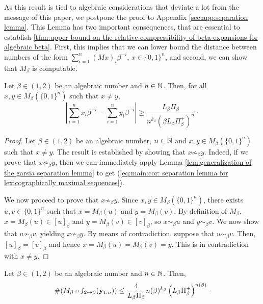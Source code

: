 As this result is tied to algebraic considerations that deviate a lot from the message of this paper, we postpone the proof to Appendix \ref{sec:app:separation lemma}. This Lemma has two important consequences, that are essential to establish \ref{thm:upper bound on the relative compressibility of beta expansions for algebraic beta}. First, this implies that we can lower bound the distance between numbers of the form $\sum_{i=1}^n (Mx)_i \beta^{-i}$, $x \in \{0,1\}^n$, and second, we can show that $M_\beta$ is computable.
\begin{corollary}\label{cor: separation lemma for lexicographically maximal sequences}
    Let $\beta \in (1,2)$ be an algebraic number and $n \in \mathbb{N}$. Then, for all $x,y \in M_\beta\left(\{0,1\}^n\right)$ such that $x \neq y$,
    \begin{equation}\label{eq:main:cor: separation lemma for lexicographically maximal sequences}
        \left|\sum_{i=1}^n x_i \beta^{-i} - \sum_{i=1}^n y_i \beta^{-i}\right| \geq \frac{L_\beta\Pi_\beta}{\displaystyle  n^{k_\beta}\left(\beta L_\beta \Pi_\beta^+ \right)^n}\cdot
    \end{equation}
\end{corollary}
\begin{proof}
    Let $\beta \in (1,2)$ be an algebraic number, $n \in \mathbb{N}$ and $x,y \in M_\beta\left(\{0,1\}^n\right)$ such that $x \neq y$. The result is established by showing that $x \not\sim_\beta y$. Indeed, if we prove that $x \not\sim_\beta y$, then we can immediately apply Lemma \ref{lem:generalization of the garsia separation lemma} to get (\ref{eq:main:cor: separation lemma for lexicographically maximal sequences}).
    
    We now proceed to prove that $x \not\sim_\beta y$. Since $x,y \in M_\beta(\{0,1\}^n)$, there exists $u,v \in \{0,1\}^n$ such that $x = M_\beta(u)$ and $y = M_\beta(v)$. By definition of $M_\beta$, $x = M_\beta(u) \in [u]_\beta$ and $y = M_\beta(v) \in [v]_\beta$, so $x \sim_\beta u$ and $y \sim_\beta v$. We now show that $u \not\sim_\beta v$, yielding $x \not\sim_\beta y$. By means of contradiction, suppose that $u \sim_\beta v$. Then, $[u]_\beta = [v]_\beta$ and hence $x = M_\beta(u) = M_\beta(v) = y$. This is in contradiction with $x \neq y$.
\end{proof}
\begin{lemma}\label{lem:bounding the size of the output set of the multivalued function projected on lexicographically maximal sequences}
    Let $\beta \in (1,2)$ be an algebraic number and $n \in \mathbb{N}$. Then,
    \begin{equation}\label{eq:main:lem:bounding the size of the output set of the multivalued function projected on lexicographically maximal sequences}
        \# (M_\beta \circ f_{2 \to \beta}({\bf y}_{1:n})) \leq \frac{4}{L_\beta\Pi_\beta}n(\beta)^{k_\beta}\left(L_\beta \Pi_\beta^+ \right)^{n(\beta)}\cdot
    \end{equation}
\end{lemma}
